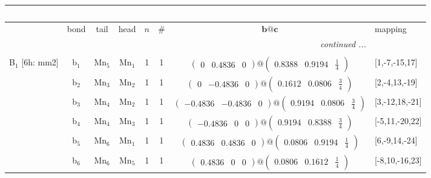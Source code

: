 \documentclass[fleqn,10pt,landscape]{article}
\begin{document}
\begin{itemize}
\begin{center}
\begin{longtable}{cc|cc|c|c|c|l}
\multicolumn{7}{l}{\tablename\ \thetable{}} \\
 \hline \hline
 & bond & tail & head & $n$ & \# & $\bm{b}@\bm{c}$ & mapping \\ \hline \endhead

 \hline \hline
\multicolumn{7}{r}{\footnotesize\it continued ...} \\ \endfoot

 \hline \hline
\multicolumn{7}{r}{} \\ \endlastfoot

B$_{1}$ [6h: mm2] & b$_{1}$ & Mn$_{5}$ & Mn$_{1}$ & 1 & 1 & $\begin{pmatrix} 0 & 0.4836 & 0 \end{pmatrix}@\begin{pmatrix} 0.8388 & 0.9194 & \frac{1}{4} \end{pmatrix}$ & [1,-7,-15,17] \\
& b$_{2}$ & Mn$_{3}$ & Mn$_{2}$ & 1 & 1 & $\begin{pmatrix} 0 & -0.4836 & 0 \end{pmatrix}@\begin{pmatrix} 0.1612 & 0.0806 & \frac{3}{4} \end{pmatrix}$ & [2,-4,13,-19] \\
& b$_{3}$ & Mn$_{4}$ & Mn$_{2}$ & 1 & 1 & $\begin{pmatrix} -0.4836 & -0.4836 & 0 \end{pmatrix}@\begin{pmatrix} 0.9194 & 0.0806 & \frac{3}{4} \end{pmatrix}$ & [3,-12,18,-21] \\
& b$_{4}$ & Mn$_{4}$ & Mn$_{3}$ & 1 & 1 & $\begin{pmatrix} -0.4836 & 0 & 0 \end{pmatrix}@\begin{pmatrix} 0.9194 & 0.8388 & \frac{3}{4} \end{pmatrix}$ & [-5,11,-20,22] \\
& b$_{5}$ & Mn$_{6}$ & Mn$_{1}$ & 1 & 1 & $\begin{pmatrix} 0.4836 & 0.4836 & 0 \end{pmatrix}@\begin{pmatrix} 0.0806 & 0.9194 & \frac{1}{4} \end{pmatrix}$ & [6,-9,14,-24] \\
& b$_{6}$ & Mn$_{6}$ & Mn$_{5}$ & 1 & 1 & $\begin{pmatrix} 0.4836 & 0 & 0 \end{pmatrix}@\begin{pmatrix} 0.0806 & 0.1612 & \frac{1}{4} \end{pmatrix}$ & [-8,10,-16,23] \\ \hline

\end{longtable}
\end{center}
\end{itemize}
\end{document}

